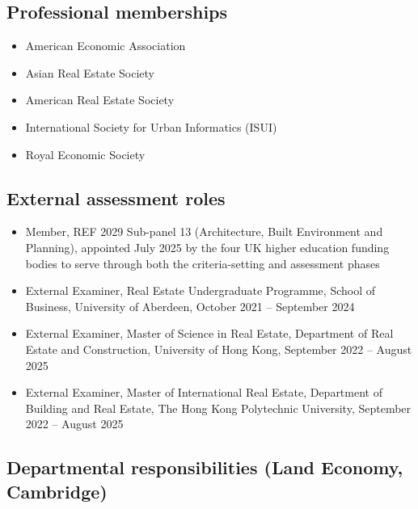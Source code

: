 \documentclass[11pt,a4paper]{article}
\providecommand{\tightlist}{%
  \setlength{\itemsep}{1pt}\setlength{\parskip}{0pt}}
\begin{document}
\subsection{Professional memberships}\label{professional-memberships}

\begin{itemize}
\tightlist
\item
  American Economic Association
\item
  Asian Real Estate Society
\item
  American Real Estate Society
\item
  International Society for Urban Informatics (ISUI)
\item
  Royal Economic Society
\end{itemize}

\subsection{External assessment roles}\label{external-assessment-roles}

\begin{itemize}
\tightlist
\item
  Member, REF 2029 Sub-panel 13 (Architecture, Built Environment and
  Planning), appointed July 2025 by the four UK higher education funding
  bodies to serve through both the criteria-setting and assessment
  phases
\item
  External Examiner, Real Estate Undergraduate Programme, School of
  Business, University of Aberdeen, October 2021 -- September 2024
\item
  External Examiner, Master of Science in Real Estate, Department of
  Real Estate and Construction, University of Hong Kong, September 2022
  -- August 2025
\item
  External Examiner, Master of International Real Estate, Department of
  Building and Real Estate, The Hong Kong Polytechnic University,
  September 2022 -- August 2025
\end{itemize}

\subsection{Departmental responsibilities (Land Economy,
Cambridge)}\label{departmental-responsibilities-land-economy-cambridge}
\end{document}
